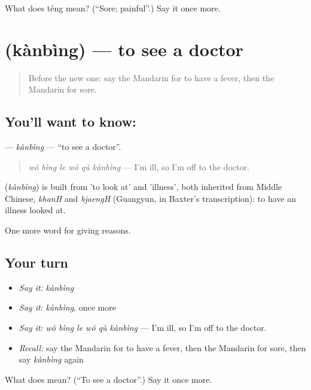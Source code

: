 \begin{tcolorbox}[breakable,colback=teal!4,colframe=teal!35!black,title={Before you move on}]
What does téng mean? (\textquotedblleft{}Sore; painful\textquotedblright{}.) Say it once more.
\end{tcolorbox}
\section[\texorpdfstring{\zh{看病} (kànbìng)}{看病 (kànbìng)}]{ (kànbìng) — to see a doctor}

\label{lesson:ZH-C130-kanbing}



\begin{quote}
Before the new one: say the Mandarin for to have a fever, then the Mandarin for sore.
\end{quote}

\subsection*{You'll want to know: }
\textbf{} — \emph{kànbìng} — \textquotedblleft{}to see a doctor\textquotedblright{}.

\begin{quote}
\textbf{} \emph{wǒ bìng le wǒ qù kànbìng} — I'm ill, so I'm off to the doctor.
\end{quote}

\begin{cousinweb}
\textbf{} (\emph{kànbìng}) is built from  'to look at' and  'illness', both inherited from Middle Chinese, \emph{khanH} and \emph{bjaengH} (Guangyun, in Baxter's transcription): to have an illness looked at.
\end{cousinweb}

\begin{grammarlens}[title={What you've built}]
One more word for giving reasons.
\end{grammarlens}

\subsection*{Your turn}
\begin{itemize}
\raggedright
  \item \emph{Say it:} \emph{kànbìng}
  \item \emph{Say it:} \emph{kànbìng}, once more
  \item \emph{Say it:} \emph{wǒ bìng le wǒ qù kànbìng} — I'm ill, so I'm off to the doctor.
  \item \emph{Recall:} say the Mandarin for to have a fever, then the Mandarin for sore, then say \emph{kànbìng} again
\end{itemize}

\begin{tcolorbox}[breakable,colback=teal!4,colframe=teal!35!black,title={Before you move on}]
What does  mean? (\textquotedblleft{}To see a doctor\textquotedblright{}.) Say it once more.
\end{tcolorbox}
